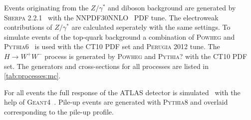 Events originating from the $Z/\gamma^*$ and diboson background are generated by
\textsc{Sherpa 2.2.1}~\cite{Sherpa,Gleisberg:2008fv,Cascioli:2011va,Schumann:2007mg,Hoeche:2012yf}
with the \textsc{NNPDF30NNLO}~\cite{NNPDF30} PDF tune.
The electroweak contributions of $Z/\gamma^*$ are calculated seperately with the same settings.
To simulate events of the top-quark background a combination of \textsc{Powheg} and \textsc{Pythia6}~\cite{Pythia6}
is used with the \textsc{CT10} PDF set and \textsc{Perugia 2012} tune.
The $H\to W^+W^-$ process is generated by \textsc{Powheg} and \textsc{Pythia?} with the \textsc{CT10} PDF set.
The generators and cross-sections for all processes are listed in \cref{tab:processes:mc}.

For all events the full response of the ATLAS detector is simulated~\cite{SOFT-2010-01} with the help of \textsc{Geant4}~\cite{Geant4}.
Pile-up events are generated with \textsc{Pythia8} and overlaid corresponding to the pile-up profile.


